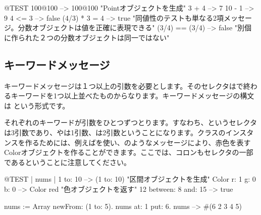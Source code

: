 \documentclass[a4paper,10pt,twoside]{book}
\begin{document}
\begin{code}{@TEST}
100@100      --> 100@100  "Pointオブジェクトを生成"
3 + 4              --> 7
10 - 1            --> 9
4 <= 3            --> false
(4/3) * 3 = 4   --> true  "同値性のテストも単なる2項メッセージ。分数オブジェクトは値を正確に表現できる"
(3/4) == (3/4) --> false  "別個に作られた２つの分数オブジェクトは同一ではない"
\end{code}


\subsection{キーワードメッセージ} 

キーワードメッセージは１つ以上の引数を必要とします。そのセレクタは\ct{:}で終わるキーワードを1つ以上並べたものからなります。キーワードメッセージの構文は
という形式です。

それぞれのキーワードが引数をひとつずつとります。すなわち、というセレクタは3引数であり、やは1引数、は2引数ということになります。クラスのインスタンスを作るためには、例えばを使い、のようなメッセージにより、赤色を表すColorオブジェクトを作ることができます。ここでは、コロンもセレクタの一部であるということに注意してください。


\begin{code}{@TEST | nums |}
1 to: 10                        --> (1 to: 10)  "区間オブジェクトを生成"
Color r: 1 g: 0 b: 0       --> Color red  "色オブジェクトを返す"
12 between: 8 and: 15 --> true

nums := Array newFrom: (1 to: 5).
nums at: 1 put: 6.
nums --> #(6 2 3 4 5)
\end{code}

\end{document}
